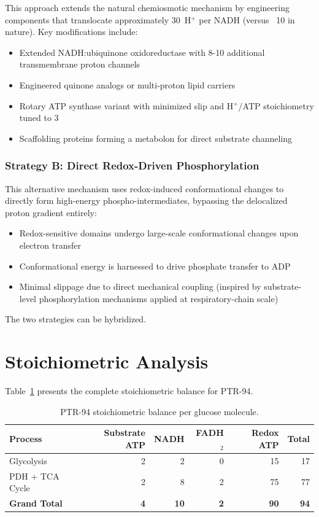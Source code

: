 \documentclass[12pt]{article}
\begin{document}
This approach extends the natural chemiosmotic mechanism by engineering components that translocate approximately 30~H$^+$ per NADH (versus ~10 in nature). Key modifications include:
\begin{itemize}
    \item Extended NADH:ubiquinone oxidoreductase with 8-10 additional transmembrane proton channels
    \item Engineered quinone analogs or multi-proton lipid carriers
    \item Rotary ATP synthase variant with minimized slip and H$^+$/ATP stoichiometry tuned to 3
    \item Scaffolding proteins forming a metabolon for direct substrate channeling
\end{itemize}

\subsubsection{Strategy B: Direct Redox-Driven Phosphorylation}

This alternative mechanism uses redox-induced conformational changes to directly form high-energy phospho-intermediates, bypassing the delocalized proton gradient entirely:
\begin{itemize}
    \item Redox-sensitive domains undergo large-scale conformational changes upon electron transfer
    \item Conformational energy is harnessed to drive phosphate transfer to ADP
    \item Minimal slippage due to direct mechanical coupling (inspired by substrate-level phosphorylation mechanisms applied at respiratory-chain scale)
\end{itemize}

The two strategies can be hybridized.

\section{Stoichiometric Analysis}

Table~\ref{tab:stoichiometry} presents the complete stoichiometric balance for PTR-94.

\begin{table}[H]
\centering
\caption{PTR-94 stoichiometric balance per glucose molecule.}
\label{tab:stoichiometry}
\begin{tabular}{lrrrrr}
\toprule
Process & Substrate ATP & NADH & FADH$_2$ & Redox ATP & Total \\
\midrule
Glycolysis      & 2 & 2 & 0 & 15 & 17 \\
PDH + TCA Cycle & 2 & 8 & 2 & 75 & 77 \\
\midrule
\textbf{Grand Total} & \textbf{4} & \textbf{10} & \textbf{2} & \textbf{90} & \textbf{94} \\
\bottomrule
\end{tabular}
\end{table}
\end{document}
